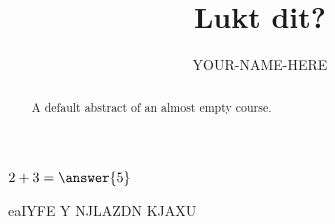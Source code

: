 \documentclass{ximera}
\title{Lukt dit?}
\author{YOUR-NAME-HERE}
\begin{document}
\begin{abstract}
    A default abstract of an almost empty course.
\end{abstract}
\maketitle


\begin{exercise}
    $2+3=\answer{5}$
    \begin{solution}
        eaIYFE Y NJLAZDN KJAXU
    \end{solution}
\end{exercise}
\end{document}
